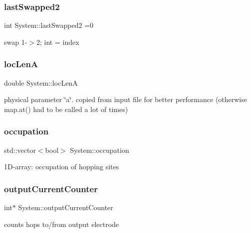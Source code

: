 \subsubsection{\texorpdfstring{last\+Swapped2}{lastSwapped2}}
{\footnotesize\ttfamily int System\+::last\+Swapped2 =0\hspace{0.3cm}{\ttfamily [private]}}

swap 1-\/$>$2; int = index \mbox{\label{classSystem_a292939d005702b34cb3d40d169b24639}} 
\subsubsection{\texorpdfstring{loc\+LenA}{locLenA}}
{\footnotesize\ttfamily double System\+::loc\+LenA\hspace{0.3cm}{\ttfamily [private]}}

physical parameter \char`\"{}a\char`\"{}. copied from input file for better performance (otherwise map.\+at() had to be called a lot of times) \mbox{\label{classSystem_af13aaae75d6cff51d202b004a9fdc3d4}} 
\subsubsection{\texorpdfstring{occupation}{occupation}}
{\footnotesize\ttfamily std\+::vector$<$bool$>$ System\+::occupation\hspace{0.3cm}{\ttfamily [private]}}

1\+D-\/array\+: occupation of hopping sites \mbox{\label{classSystem_a236f2d392daa817d39a5b23a8e6a57d5}} 
\subsubsection{\texorpdfstring{output\+Current\+Counter}{outputCurrentCounter}}
{\footnotesize\ttfamily int$\ast$ System\+::output\+Current\+Counter}

counts hops to/from output electrode \mbox{\label{classSystem_acbe0d31bddfc490ec048dfaca2df2558}} 
